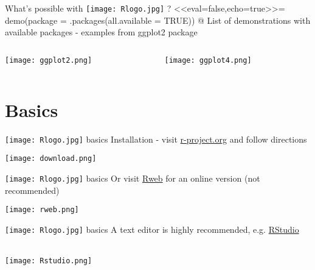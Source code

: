 \documentclass[xcolor=svgnames]{beamer}
\begin{document}
\begin{frame}[t,fragile]{What's possible with \texttt{[image: Rlogo.jpg]} \hspace{0.2em}? }
<<eval=false,echo=true>>=
demo(package = .packages(all.available = TRUE))
@
List of demonstrations with available packages - examples from ggplot2 package
\begin{columns}
\begin{column}{0.5\textwidth}
\begin{center}
\texttt{[image: ggplot2.png]}
\end{center}
\end{column}
\begin{column}{0.5\textwidth}
\begin{center}
\texttt{[image: ggplot4.png]}
\end{center}
\end{column}
\end{columns}
\end{frame}

\section{Basics}
\begin{frame}[t]{\texttt{[image: Rlogo.jpg]} \hspace{0.01in} basics}
Installation - visit \href{http://cran.us.r-project.org/}{r-project.org} and follow directions
\centerline{\texttt{[image: download.png]}}
\end{frame}

\begin{frame}[t]{\texttt{[image: Rlogo.jpg]} \hspace{0.01in} basics}
Or visit \href{http://pbil.univ-lyon1.fr/Rweb/}{Rweb} for an online version (not recommended)
\centerline{\texttt{[image: rweb.png]}}
\end{frame}

\begin{frame}[t]{\texttt{[image: Rlogo.jpg]} \hspace{0.01in} basics}
A text editor is highly recommended, e.g. \href{http://www.rstudio.com/}{RStudio}\\~\\
\centerline{\texttt{[image: Rstudio.png]}}
\end{frame}
\end{document}
